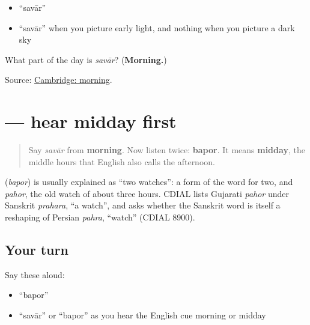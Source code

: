 \begin{itemize}
\raggedright
  \item \textquotedblleft{}savār\textquotedblright{}
  \item \textquotedblleft{}savār\textquotedblright{} when you picture early light, and nothing when you picture a dark sky
\end{itemize}

\begin{tcolorbox}[breakable,colback=teal!4,colframe=teal!35!black,title={Before you move on}]
What part of the day is \emph{savār}? (\textbf{Morning.})

Source: \href{https://dictionary.cambridge.org/dictionary/english-gujarati/morning}{Cambridge: morning}.
\end{tcolorbox}
\section[\texorpdfstring{\gu{બપોર} (bapor)}{બપોર (bapor)}]{ — hear midday first}

\label{lesson:GU-C24-hear-bapor}



\begin{quote}
Say \emph{savār} from \textbf{morning}. Now listen twice: \textbf{bapor}. It means \textbf{midday}, the middle hours that English also calls the afternoon.
\end{quote}

\begin{cousinweb}
\textbf{} (\emph{bapor}) is usually explained as \textquotedblleft{}two watches\textquotedblright{}: a form of the word for two, and \emph{pahor}, the old watch of about three hours. CDIAL lists Gujarati \emph{pahor} under Sanskrit \emph{prahara}, \textquotedblleft{}a watch\textquotedblright{}, and asks whether the Sanskrit word is itself a reshaping of Persian \emph{pahra}, \textquotedblleft{}watch\textquotedblright{} (CDIAL 8900).
\end{cousinweb}

\subsection*{Your turn}
Say these aloud:

\begin{itemize}
\raggedright
  \item \textquotedblleft{}bapor\textquotedblright{}
  \item \textquotedblleft{}savār\textquotedblright{} or \textquotedblleft{}bapor\textquotedblright{} as you hear the English cue morning or midday
\end{itemize}

